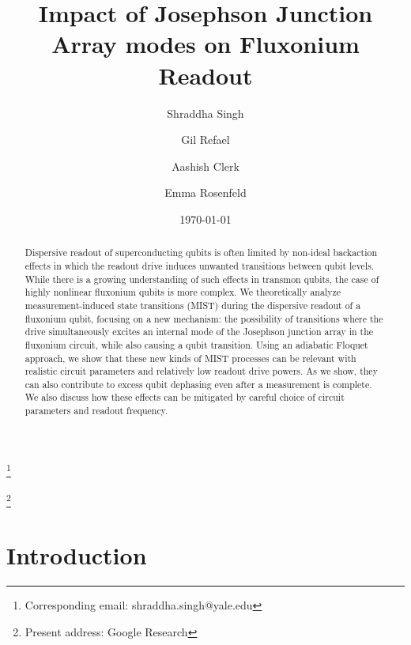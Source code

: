 \documentclass[%
reprint,
superscriptaddress,
 amsmath,amssymb,
 aps,
 prx,
longbibliography,
floatfix,
]{revtex4-2}
\begin{document}
\title{Impact of Josephson Junction Array modes on Fluxonium Readout}

\author{Shraddha Singh}\thanks{Corresponding email: shraddha.singh@yale.edu}
\author{Gil Refael}
\author{Aashish Clerk}
\author{Emma Rosenfeld}\thanks{Present address: Google Research}
\date{\today}%

\begin{abstract}
Dispersive readout of superconducting qubits is often limited by non-ideal backaction effects in which the readout drive induces unwanted transitions between qubit levels.  While there is a growing understanding of such effects in transmon qubits, the case of highly nonlinear fluxonium qubits is more complex.  We theoretically analyze measurement-induced state transitions (MIST) during the dispersive readout of a fluxonium qubit, focusing on a new mechanism: the possibility of transitions where the drive simultaneously excites an internal mode of the Josephson junction array in the fluxonium circuit, while also causing a qubit transition. Using an adiabatic Floquet approach, we show that these new kinds of MIST processes 
can be relevant with realistic circuit parameters and relatively low readout drive powers.  As we show, they can also contribute to excess qubit dephasing even after a measurement is complete.
We also discuss how these effects can be mitigated by careful choice of circuit parameters and readout frequency.
\end{abstract}

\maketitle
\section{Introduction}
\end{document}
